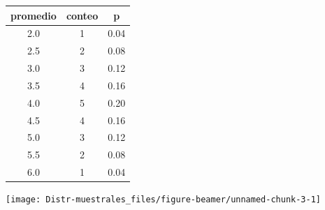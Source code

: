 \documentclass[
  10pt,
  ignorenonframetext,
]{beamer}
\begin{document}
\begin{frame}{}
\protect\hypertarget{section-15}{}
\begin{minipage}{\textwidth}

\begin{multicols}{2}


\begin{tabular}{c|c|c}
\hline
promedio & conteo & p\\
\hline
2.0 & 1 & 0.04\\
\hline
2.5 & 2 & 0.08\\
\hline
3.0 & 3 & 0.12\\
\hline
3.5 & 4 & 0.16\\
\hline
4.0 & 5 & 0.20\\
\hline
4.5 & 4 & 0.16\\
\hline
5.0 & 3 & 0.12\\
\hline
5.5 & 2 & 0.08\\
\hline
6.0 & 1 & 0.04\\
\hline
\end{tabular}



\begin{flushright}\texttt{[image: Distr-muestrales\_files/figure-beamer/unnamed-chunk-3-1]} \end{flushright}



\end{multicols}

\end{minipage}
\end{frame}
\end{document}
